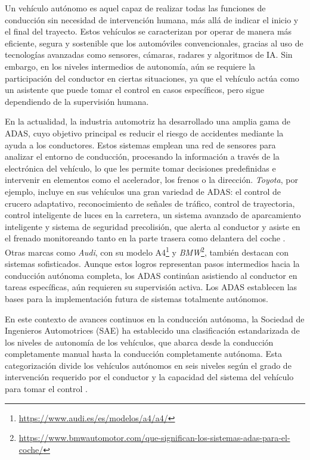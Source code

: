 Un vehículo autónomo es aquel capaz de realizar todas las funciones de conducción sin necesidad de intervención humana, más allá de indicar el inicio y el final del trayecto. Estos vehículos se caracterizan por operar de manera más eficiente, segura y sostenible que los automóviles convencionales, gracias al uso de tecnologías avanzadas como sensores, cámaras, radares y algoritmos de \ac{IA}. Sin embargo, en los niveles intermedios de autonomía, aún se requiere la participación del conductor en ciertas situaciones, ya que el vehículo actúa como un asistente que puede tomar el control en casos específicos, pero sigue dependiendo de la supervisión humana.

En la actualidad, la industria automotriz ha desarrollado una amplia gama de \ac{ADAS}, cuyo objetivo principal es reducir el riesgo de accidentes mediante la ayuda a los conductores. Estos sistemas emplean una red de sensores para analizar el entorno de conducción, procesando la información a través de la electrónica del vehículo, lo que les permite tomar decisiones predefinidas e intervenir en elementos como el acelerador, los frenos o la dirección. \textit{Toyota}, por ejemplo, incluye en sus vehículos una gran variedad de \ac{ADAS}: el control de crucero adaptativo, reconocimiento de señales de tráfico, control de trayectoria, control inteligente de luces en la carretera, un sistema avanzado de aparcamiento inteligente y sistema de seguridad precolisión, que alerta al conductor y asiste en el frenado monitoreando tanto en la parte trasera como delantera del coche \cite{toyota-assist}. Otras marcas como \textit{Audi}, con su modelo A4\footnote{\url{https://www.audi.es/es/modelos/a4/a4/}} y \textit{BMW}\footnote{\url{https://www.bmwautomotor.com/que-significan-los-sistemas-adas-para-el-coche/}}, también destacan con sistemas sofisticados. Aunque estos logros representan pasos intermedios hacia la conducción autónoma completa, los \ac{ADAS} continúan asistiendo al conductor en tareas específicas, aún requieren su supervisión activa. Los \ac{ADAS} establecen las bases para la implementación futura de sistemas totalmente autónomos. 

En este contexto de avances continuos en la conducción autónoma, la Sociedad de Ingenieros Automotrices (\ac{SAE}) ha establecido una clasificación estandarizada de los niveles de autonomía de los vehículos, que abarca desde la conducción completamente manual hasta la conducción completamente autónoma. Esta categorización divide los vehículos autónomos en seis niveles según el grado de intervención requerido por el conductor y la capacidad del sistema del vehículo para tomar el control \cite{autobild-autonomous}.

